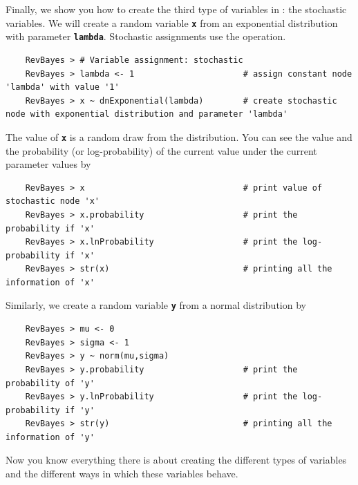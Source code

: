\documentclass[11pt]{article}
\newcommand{\cl}[1]{{\texttt{\textbf{#1}}}}
\newcommand{\rbdn}{{\Large \symbol{126}}} %
\begin{document}
Finally, we show you how to create the third type of variables in \Rev: the stochastic variables. 
We will create a random variable \cl{x} from an exponential distribution with parameter \cl{lambda}.  
Stochastic assignments use the \cl{\rbdn} operation.
{\tt \begin{snugshade*}
\begin{lstlisting}    
    RevBayes > # Variable assignment: stochastic
    RevBayes > lambda <- 1                      # assign constant node 'lambda' with value '1'
    RevBayes > x ~ dnExponential(lambda)        # create stochastic node with exponential distribution and parameter 'lambda'
\end{lstlisting}
\end{snugshade*}}
The value of \cl{x} is a random draw from the distribution. 
You can see the value and the probability (or log-probability) of the current value under the current parameter values by
{\tt \begin{snugshade*}
\begin{lstlisting}    
    RevBayes > x                                # print value of stochastic node 'x'
    RevBayes > x.probability                    # print the probability if 'x'
    RevBayes > x.lnProbability                  # print the log-probability if 'x'
    RevBayes > str(x)                           # printing all the information of 'x'
\end{lstlisting}
\end{snugshade*}}
Similarly, we create a random variable \cl{y} from a normal distribution by
{\tt \begin{snugshade*}
\begin{lstlisting}    
    RevBayes > mu <- 0
    RevBayes > sigma <- 1
    RevBayes > y ~ norm(mu,sigma)	
    RevBayes > y.probability                    # print the probability of 'y'
    RevBayes > y.lnProbability                  # print the log-probability if 'y'
    RevBayes > str(y)                           # printing all the information of 'y'
\end{lstlisting}
\end{snugshade*}}
Now you know everything there is about creating the different types of variables and the different ways in which these variables behave.
\end{document}
